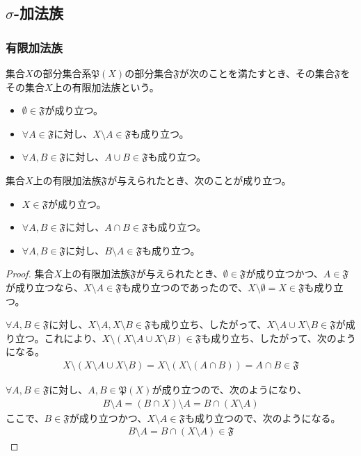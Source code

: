 \documentclass[dvipdfmx]{jsarticle}
\begin{document}
\subsection{$\sigma$-加法族}%
\subsubsection{有限加法族}%
\begin{axs}[有限加法族の公理]
集合$X$の部分集合系$\mathfrak{P}(X)$の部分集合$\mathfrak{F}$が次のことを満たすとき、その集合$\mathfrak{F}$をその集合$X$上の有限加法族という。
\begin{itemize}
\item
  $\mathfrak{\emptyset \in F}$が成り立つ。
\item
  $\forall A \in \mathfrak{F}$に対し、$X \setminus A \in \mathfrak{F}$も成り立つ。
\item
  $\forall A,B \in \mathfrak{F}$に対し、$A \cup B \in \mathfrak{F}$も成り立つ。
\end{itemize}
\end{axs}
\begin{thm}\label{4.5.2.1}
集合$X$上の有限加法族$\mathfrak{F}$が与えられたとき、次のことが成り立つ。
\begin{itemize}
\item
  $X \in \mathfrak{F}$が成り立つ。
\item
  $\forall A,B \in \mathfrak{F}$に対し、$A \cap B \in \mathfrak{F}$も成り立つ。
\item
  $\forall A,B \in \mathfrak{F}$に対し、$B \setminus A \in \mathfrak{F}$も成り立つ。
\end{itemize}
\end{thm}
\begin{proof}
集合$X$上の有限加法族$\mathfrak{F}$が与えられたとき、$\mathfrak{\emptyset \in F}$が成り立つかつ、$A \in \mathfrak{F}$が成り立つなら、$X \setminus A \in \mathfrak{F}$も成り立つのであったので、$X \setminus \emptyset = X \in \mathfrak{F}$も成り立つ。\par
$\forall A,B \in \mathfrak{F}$に対し、$X \setminus A,X \setminus B\in \mathfrak{F}$も成り立ち、したがって、$X \setminus A \cup X \setminus B\in \mathfrak{F}$が成り立つ。これにより、$X \setminus (X \setminus A \cup X \setminus B)\in \mathfrak{F}$も成り立ち、したがって、次のようになる。
\begin{align*}
X \setminus (X \setminus A \cup X \setminus B) = X \setminus \left( X \setminus (A \cap B) \right) = A \cap B\in \mathfrak{F}
\end{align*}\par
$\forall A,B \in \mathfrak{F}$に対し、$A,B\in \mathfrak{P}(X)$が成り立つので、次のようになり、
\begin{align*}
B \setminus A = (B \cap X) \setminus A = B \cap (X \setminus A)
\end{align*}
ここで、$B\in \mathfrak{F}$が成り立つかつ、$X \setminus A\in \mathfrak{F}$も成り立つので、次のようになる。
\begin{align*}
B \setminus A = B \cap (X \setminus A)\in \mathfrak{F}
\end{align*}
\end{proof}
\end{document}

